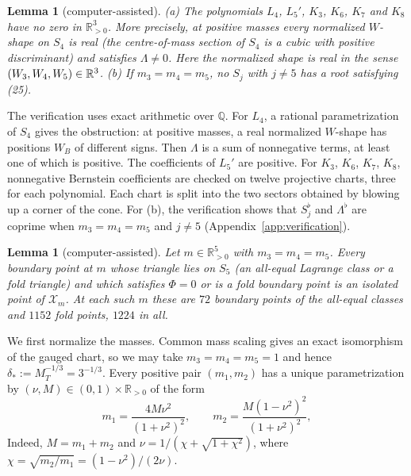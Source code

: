 \documentclass[Threeside,11pt]{article}
\newtheorem{lemma}[theorem]{Lemma}
\theoremstyle{definition}
\theoremstyle{remark}
\numberwithin{equation}{section}
\theoremstyle{remark}
\newcommand{\Rp}{\mathbb{R}_{>0}}
\begin{document}
\begin{lemma}[computer-assisted]\label{lem:d2-empty}
\textup{(a)} The polynomials $L_4$, $L_5'$, $K_3$, $K_6$, $K_7$ and $K_8$ have no zero in $\Rp^3$.
{More precisely, at positive masses every normalized $W$-shape on $S_4$ is real
\textup{(}the centre-of-mass section of $S_4$ is a cubic with positive discriminant\textup{)}
and satisfies $\Lambda\ne0$. Here the normalized shape is real in the sense
$(W_3,W_4,W_5)\in\mathbb R^3$.}
\textup{(b)} If $m_3=m_4=m_5$, no $S_j$ with $j\ne5$ has a root satisfying \textup{(25)}.
\end{lemma}
{The verification uses exact arithmetic over $\mathbb Q$.
For $L_4$, a rational parametrization of $S_4$ gives the obstruction:
at positive masses, a real normalized $W$-shape has positions $W_B$ of different signs.
Then $\Lambda$ is a sum of nonnegative terms, at least one of which is positive.
The coefficients of $L_5'$ are positive.  For $K_3$, $K_6$, $K_7$, $K_8$, nonnegative
Bernstein coefficients are checked on twelve projective charts, three for each
polynomial.  Each chart is split into the two sectors obtained by blowing up a corner
of the cone.  For (b), the verification shows that $S_j^\flat$ and $\Lambda^\flat$ are
coprime when $m_3=m_4=m_5$ and $j\ne5$ (Appendix~\ref{app:verification}).}

\begin{lemma}[computer-assisted]\label{lem:d2-L5}
Let $m\in\Rp^5$ with $m_3=m_4=m_5$.  Every boundary point at $m$ whose triangle lies on $S_5$ \textup{(}an
all-equal Lagrange class or a fold triangle\textup{)} and which satisfies $\Phi=0$ or is a fold
boundary point is an isolated point of $\mathcal X_m$.  At each such $m$ these are $72$ boundary points of the all-equal
classes and $1152$ fold points, $1224$ in all.
\end{lemma}

{We first normalize the masses.  Common mass scaling gives an exact
isomorphism of the gauged chart, so we may take $m_3=m_4=m_5=1$ and hence
$\delta_*:=M_T^{-1/3}=3^{-1/3}$.
Every positive pair $(m_1,m_2)$ has a unique parametrization by
$(\nu,M)\in(0,1)\times\Rp$ of the form}
\[
  m_1=\frac{4M\nu^2}{(1+\nu^2)^2},\qquad m_2=\frac{M(1-\nu^2)^2}{(1+\nu^2)^2},
\]
{Indeed, $M=m_1+m_2$ and $\nu=1/(\chi+\sqrt{1+\chi^2})$, where
$\chi=\sqrt{m_2/m_1}=(1-\nu^2)/(2\nu)$.}
\end{document}
